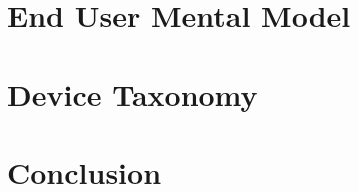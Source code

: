 \documentclass[12pt, draft]{ucthesis}
\begin{document}
\chapter{End User Mental Model}


\chapter{Device Taxonomy}


\chapter{Conclusion}

\nocite{*}



\appendix
\end{document}
